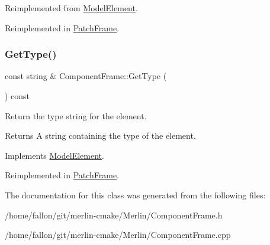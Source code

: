 Reimplemented from \hyperlink{classModelElement_ae2bb7fbbbde063a49a02ea6fe22d92c4}{Model\+Element}.



Reimplemented in \hyperlink{classPatchFrame_a51ebb7649aa5fc1403bcd70925d7c85f}{Patch\+Frame}.

\mbox{\label{classComponentFrame_ab87e0e461ced7eb26a6c58bd1b04cf05}} 
\subsubsection{\texorpdfstring{Get\+Type()}{GetType()}}
{\footnotesize\ttfamily const string \& Component\+Frame\+::\+Get\+Type (\begin{DoxyParamCaption}{ }\end{DoxyParamCaption}) const\hspace{0.3cm}{\ttfamily [virtual]}}

Return the type string for the element. \begin{DoxyReturn}{Returns}
A string containing the type of the element. 
\end{DoxyReturn}


Implements \hyperlink{classModelElement_a04dc2e51e1999fca612eb1838ec6b271}{Model\+Element}.



Reimplemented in \hyperlink{classPatchFrame_a1ef493fda343de4400b198097db32f20}{Patch\+Frame}.



The documentation for this class was generated from the following files\+:\begin{DoxyCompactItemize}
\item 
/home/fallon/git/merlin-\/cmake/\+Merlin/Component\+Frame.\+h\item 
/home/fallon/git/merlin-\/cmake/\+Merlin/Component\+Frame.\+cpp\end{DoxyCompactItemize}
